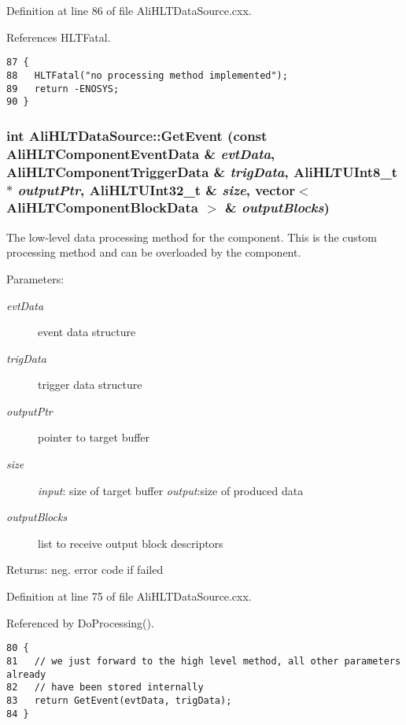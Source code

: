 Definition at line 86 of file Ali\-HLTData\-Source.cxx.

References HLTFatal.

\footnotesize\begin{verbatim}87 {
88   HLTFatal("no processing method implemented");
89   return -ENOSYS;
90 }
\end{verbatim}\normalsize 


\subsubsection{\setlength{\rightskip}{0pt plus 5cm}int Ali\-HLTData\-Source::Get\-Event (const {\bf Ali\-HLTComponent\-Event\-Data} \& {\em evt\-Data}, {\bf Ali\-HLTComponent\-Trigger\-Data} \& {\em trig\-Data}, {\bf Ali\-HLTUInt8\_\-t} $\ast$ {\em output\-Ptr}, {\bf Ali\-HLTUInt32\_\-t} \& {\em size}, vector$<$ {\bf Ali\-HLTComponent\-Block\-Data} $>$ \& {\em output\-Blocks})\hspace{0.3cm}{\tt  [private, virtual]}}\label{classAliHLTDataSource_d0}


The low-level data processing method for the component. This is the custom processing method and can be overloaded by the component. \begin{Desc}
\item[Parameters:]
\begin{description}
\item[{\em evt\-Data}]event data structure \item[{\em trig\-Data}]trigger data structure \item[{\em output\-Ptr}]pointer to target buffer \item[{\em size}]{\em input\/}: size of target buffer {\em output\/}:size of produced data \item[{\em output\-Blocks}]list to receive output block descriptors \end{description}
\end{Desc}
\begin{Desc}
\item[Returns:]neg. error code if failed \end{Desc}


Definition at line 75 of file Ali\-HLTData\-Source.cxx.

Referenced by Do\-Processing().

\footnotesize\begin{verbatim}80 {
81   // we just forward to the high level method, all other parameters already
82   // have been stored internally
83   return GetEvent(evtData, trigData);
84 }
\end{verbatim}\normalsize 


